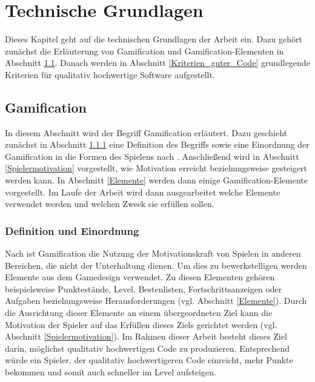\documentclass[
	oneside,  %
	ngerman, 
	final, 
	11pt, 
	a4paper, 
	1.1headlines, 
	headinclude=false, 
	footinclude=false, 
	mpinclude=false, 
	pagesize, 
	onecolumn, 
	titlepage, 
	parskip=half, 
	headsepline, 
	chapterprefix=false, 
	version=first, 
	listof=totoc, 
	bibliography=totoc, 
	toc=graduated, 
	fleqn
]{scrbook}
\begin{document}
\chapter{Technische Grundlagen}
\label{Technische_Grundlagen}
Dieses Kapitel geht auf die technischen Grundlagen der Arbeit ein.
Dazu gehört zunächst die Erläuterung von Gamification und Gamification-Elementen in Abschnitt \ref{Gamification}.
Danach werden in Abschnitt \ref{Kriterien_guter_Code} grundlegende Kriterien für qualitativ hochwertige Software aufgestellt.

\section{Gamification}
\label{Gamification}
In diesem Abschnitt wird der Begriff Gamification erläutert.
Dazu geschieht zunächst in Abschnitt \ref{Definition} eine Definition des Begriffs sowie eine Einordnung der Gamification in die Formen des Spielens nach \cite{DD2011}.
Anschließend wird in Abschnitt \ref{Spielermotivation} vorgestellt, wie Motivation erreicht beziehungsweise gesteigert werden kann.
In Abschnitt \ref{Elemente} werden dann einige Gamification-Elemente vorgestellt.
Im Laufe der Arbeit wird dann ausgearbeitet welche Elemente verwendet werden und welchen Zweck sie erfüllen sollen.

\subsection{Definition und Einordnung}
\label{Definition}
Nach \cite{SH2014} ist Gamification die Nutzung der Motivationskraft von Spielen in anderen Bereichen, die nicht der Unterhaltung dienen.
Um dies zu bewerkstelligen werden Elemente aus dem Gamedesign verwendet.
Zu diesen Elementen gehören beispielsweise Punktestände, Level, Bestenlisten, Fortschrittsanzeigen oder Aufgaben beziehungsweise Herausforderungen (vgl. Abschnitt \ref{Elemente}).
Durch die Ausrichtung dieser Elemente an einem übergeordneten Ziel kann die Motivation der Spieler auf das Erfüllen dieses Ziels gerichtet werden (vgl. Abschnitt \ref{Spielermotivation}).
Im Rahmen dieser Arbeit besteht dieses Ziel darin, möglichst qualitativ hochwertigen Code zu produzieren.
Entsprechend würde ein Spieler, der qualitativ hochwertigeren Code einreicht, mehr Punkte bekommen und somit auch schneller im Level aufsteigen.
\end{document}
